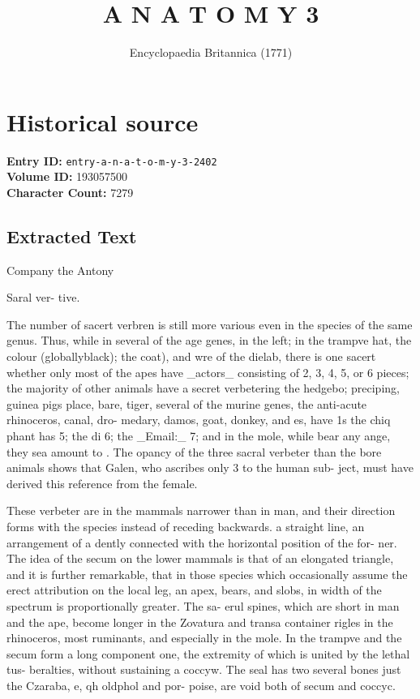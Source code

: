 \documentclass{article}
\title{A N A T O M Y 3}
\date{Encyclopaedia Britannica (1771)}
\begin{document}
\maketitle

\section*{Historical source}
\textbf{Entry ID:} \texttt{entry-a-n-a-t-o-m-y-3-2402} \\
\textbf{Volume ID:} 193057500 \\
\textbf{Character Count:} 7279

\subsection*{Extracted Text}
Company
the
Antony

Saral ver-
tive.

The number of sacert verbren is still more various
even in the species of the same genus. Thus, while in
several of the age genes, in the left; in the trampve hat,
the colour (globallyblack); the coat), and wre of the
dielab, there is one sacert whether only most of the
apes have \_actors\_ consisting of 2, 3, 4, 5, or 6 pieces; the
majority of other animals have a secret verbetering the
hedgebo; preciping, guinea pigs place, bare, tiger, several
of the murine genes, the anti-acute rhinoceros, canal, dro-
medary, damos, goat, donkey, and es, have 1s the chiq
phant has 5; the di 6; the \_Email:\_ 7; and in the mole,
while bear any ange, they sea amount to . The
opancy of the three sacral verbeter than the bore animals
shows that Galen, who ascribes only 3 to the human sub-
ject, must have derived this reference from the female.

These verbeter are in the mammals narrower than in
man, and their direction forms with the species instead of
receding backwards. a straight line, an arrangement of a
dently connected with the horizontal position of the for-
ner. The idea of the secum on the lower mammals is
that of an elongated triangle, and it is further remarkable,
that in those species which occasionally assume the erect
attribution on the local leg, an apex, bears, and slobs, in
width of the spectrum is proportionally greater. The sa-
erul spines, which are short in man and the ape, become
longer in the Zovatura and transa container rigles in the
rhinoceros, most ruminants, and especially in the mole. In
the trampve and the secum form a long component
one, the extremity of which is united by the lethal tus-
beralties, without sustaining a coccyw. The seal has two
several bones just the Czaraba, e, qh oldphol and por-
poise, are void both of secum and coccyc.
\end{document}
